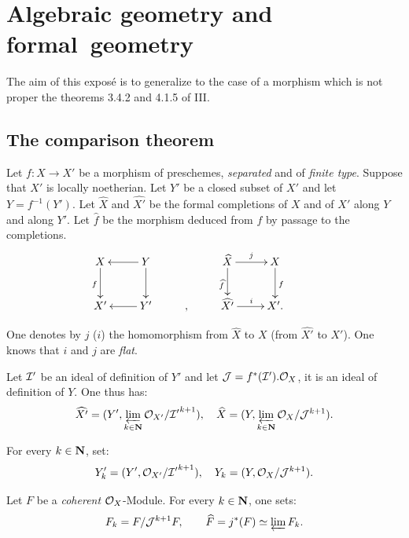 \chapter{Algebraic geometry and formal~geometry} \label{IX}

The aim of this expos\'e is to generalize to the case of a morphism which is not proper the theorems 3.4.2 and 4.1.5 of \EGA III.

\section{The comparison theorem} \label{IX.1}

Let $f\colon X\to X'$ be a morphism of preschemes, \emph{separated} and of \emph{finite type}. Suppose that $X'$ is locally noetherian. Let $Y'$ be a closed subset of $X'$ and let $Y= f^{-1}(Y')$. Let $\hat{X}$ and $\hat{X'}$ be the formal completions of $X$ and of $X'$ along $Y$ and along $Y'$. Let $\hat{f}$ be the morphism deduced from $f$ by passage to the completions.
\begin{equation} \label{eq:IX.1.1}
\begin{array}{c}
\xymatrix{ X \ar[d]_f & \ar[l] Y \ar[d]& &\hat{X}\ar[d]_{\hat f} \ar[r]^j & X\ar[d]^f &\\
X' & \ar[l] Y' &, &\hat{X'} \ar[r]^i & X'.
}
\end{array}
\end{equation}

One denotes by $j$ (\resp $i$) the homomorphism from $\hat{X}$ to $X$ (\resp from $\hat{X'}$ to $X'$). One knows that $i$ and $j$ are \emph{flat}.

Let ${\mathcal I} '$ be an ideal of definition of $Y'$ and let ${\mathcal{J}}=f^{*}({\mathcal I} '). \mathcal{O}_X$, it is an ideal of definition of $Y$. One thus has:
\begin{equation} \label{eq:IX.1.2} {\widehat{X'}=(Y', \varprojlim_{k \in \mathbf{N}}{\mathcal O}_{X'}/{{{\mathcal I}'}^{k+1}})}, \quad {\widehat{X}=(Y, \varprojlim_{k \in \mathbf{N}}\mathcal{O}_X/{{\mathcal{J}}^{k+1}})}.
\end{equation}

For every $k \in \mathbf{N}$, set:
\begin{equation} \label{eq:IX.1.3} Y'_k=(Y', {\mathcal O}_{X'}/{{{\mathcal I}'}^{k+1}}), \quad {Y_k}=(Y, \mathcal{O}_X/{{\mathcal{J}}^{k+1}}).
\end{equation}

Let $F$ be a \emph{coherent} $\mathcal{O}_X$-Module. For every $k \in \mathbf{N}$, one sets:
\begin{equation} \label{eq:IX.1.4} F_k=F/{\mathcal{J}}^{k+1}F, \qquad \widehat{F}=j^*(F)\simeq \varprojlim F_k.
\end{equation}

